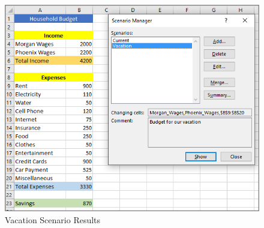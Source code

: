 \begin{figure}[H]
	\centering
	\includegraphics[width=\maxwidth{.95\linewidth}]{gfx/ch08_fig29}
	\caption{Vacation Scenario Results}
	\label{08:fig29}
\end{figure}

